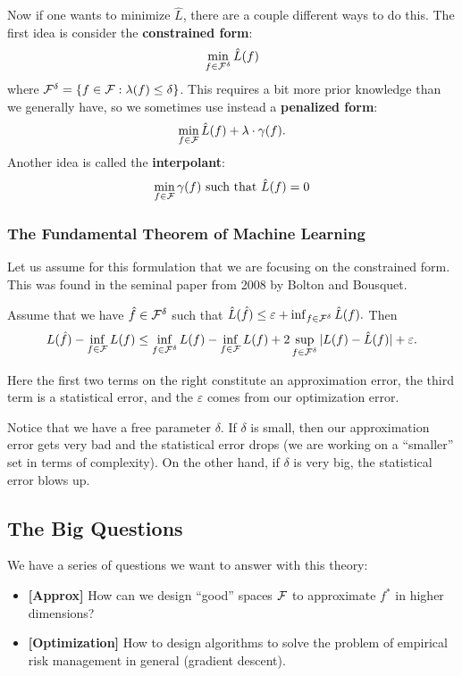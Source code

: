 \documentclass[12pt]{article}
\begin{document}
Now if one wants to minimize $\hat L$, there are a couple different ways to do this. The first idea is consider the \textbf{constrained form}:
\[\min_{f\in\mathcal{F}^\delta}\hat L(f)\]
where $\mathcal{F}^\delta=\{f\in\mathcal{F}:\lambda(f)\le\delta\}$. This requires a bit more prior knowledge than we generally have, so we sometimes use instead a \textbf{penalized form}:
\[\min_{f\in\mathcal{F}}\hat L(f)+\lambda\cdot\gamma(f).\]
Another idea is called the \textbf{interpolant}:
\[\min_{f\in\mathcal{F}} \gamma(f) \text{  such that  }\hat L(f)=0\]

\subsubsection{The Fundamental Theorem of Machine Learning}
Let us assume for this formulation that we are focusing on the constrained form. This was found in the seminal paper from 2008 by Bolton and Bousquet.
\begin{thm}[FtoML]
	Assume that we have $\hat f\in\mathcal{F}^\delta$ such that $\hat L(\hat f)\le \varepsilon+\inf_{f\in\mathcal{F}^\delta}\hat L(f).$ Then 
	\[L(\hat f)-\inf_{f\in \mathcal{F}}L(f)\le \inf_{f\in\mathcal{F}^\delta}L(f)-\inf_{f\in\mathcal{F}}L(f)+2\sup_{f\in\mathcal{F}^\delta}|L(f)-\hat L(f)|+\varepsilon.\]
\end{thm}
\begin{rmk}
	Here the first two terms on the right constitute an approximation error, the third term is a statistical error, and the $\varepsilon$ comes from our optimization error. 

	Notice that we have a free parameter $\delta$. If $\delta$ is small, then our approximation error gets very bad and the statistical error drops (we are working on a ``smaller'' set in terms of complexity). On the other hand, if $\delta$ is very big, the statistical error blows up.
\end{rmk}
\subsection{The Big Questions}
We have a series of questions we want to answer with this theory:
\begin{itemize}
	\item \textbf{[Approx]} How can we design ``good'' spaces $\mathcal{F}$ to approximate $f^\ast$ in higher dimensions?
	\item \textbf{[Optimization]} How to design algorithms to solve the problem of empirical risk management in general (gradient descent).
\end{itemize}
\end{document}
